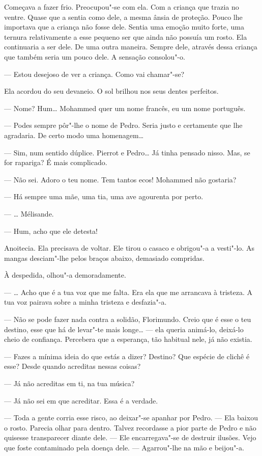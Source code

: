 Começava a fazer frio. Preocupou"-se com ela. Com a criança que trazia no
ventre. Quase que a sentia como dele, a mesma ânsia de proteção. Pouco
lhe importava que a criança não fosse dele. Sentia uma emoção muito
forte, uma ternura relativamente a esse pequeno ser que ainda não
possuía um rosto. Ela continuaria a ser dele. De uma outra maneira.
Sempre dele, através dessa criança que também seria um pouco dele. A
sensação consolou"-o.

--- Estou desejoso de ver a criança. Como vai chamar"-se?

Ela acordou do seu devaneio. O sol brilhou nos seus dentes perfeitos.

--- Nome? Hum\ldots{} Mohammed quer um nome francês, eu um nome português.

--- Podes sempre pôr"-lhe o nome de Pedro. Seria justo e certamente que lhe
agradaria. De certo modo uma homenagem\ldots{}

--- Sim, num sentido dúplice. Pierrot e Pedro\ldots{} Já tinha pensado nisso.
Mas, se for rapariga? É mais complicado.

--- Não sei. Adoro o teu nome. Tem tantos ecos! Mohammed não gostaria?

--- Há sempre uma mãe, uma tia, uma ave agourenta por perto.

--- \ldots{} Mélisande.

--- Hum, acho que ele detesta!

Anoitecia. Ela precisava de voltar. Ele tirou o casaco e obrigou"-a a
vesti"-lo. As mangas desciam"-lhe pelos braços abaixo, demasiado
compridas.

À despedida, olhou"-a demoradamente.

--- \ldots{} Acho que é a tua voz que me falta. Era ela que me arrancava à
tristeza. A tua voz pairava sobre a minha tristeza e desfazia"-a.

--- Não se pode fazer nada contra a solidão, Florimundo. Creio que é esse
o teu destino, esse que há de levar"-te mais longe\ldots{} --- ela queria
animá-lo, deixá-lo cheio de confiança. Percebera que a esperança, tão
habitual nele, já não existia.

--- Fazes a mínima ideia do que estás a dizer? Destino? Que espécie de
clichê é esse? Desde quando acreditas nessas coisas?

--- Já não acreditas em ti, na tua música?

--- Já não sei em que acreditar. Essa é a verdade.

--- Toda a gente corria esse risco, ao deixar"-se apanhar por Pedro. --- Ela
baixou o rosto. Parecia olhar para dentro. Talvez recordasse a pior
parte de Pedro e não quisesse transparecer diante dele. --- Ele
encarregava"-se de destruir ilusões. Vejo que foste contaminado pela
doença dele. --- Agarrou"-lhe na mão e beijou"-a.

